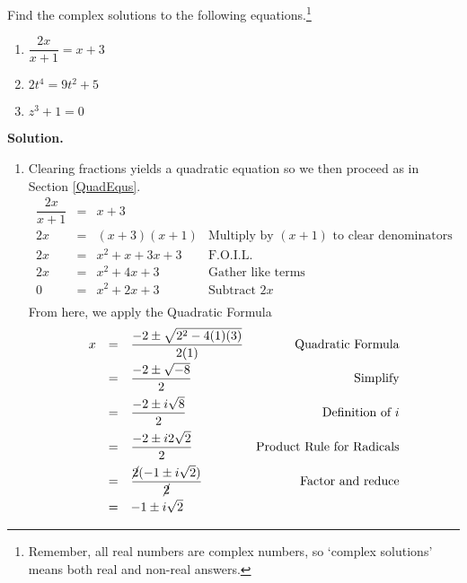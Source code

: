 \documentclass[10pt]{article}
\begin{document}
\begin{ex} \label{complexsolnsreviewex}  Find the complex solutions to the following equations.\footnote{Remember, all real numbers are complex numbers, so `complex solutions' means both real and non-real answers.} 

\begin{multicols}{3}
\begin{enumerate}


\item  $\dfrac{2x}{x+1} = x+3$

\item $2t^4 = 9t^2 + 5$

\item  $z^3 + 1 = 0$

\end{enumerate}
\end{multicols}

{\bf Solution.}

\begin{enumerate}

\enlargethispage{20pt}

\item  Clearing fractions yields a quadratic equation so we then proceed as in Section \ref{QuadEqus}.\[ \begin{array}{rclr}


\dfrac{2x}{x+1} & = &  x+3 & \\[5pt]
2x & = & (x+3)(x+1) & \text{Multiply by $(x+1)$ to clear denominators} \\

2x & = & x^2 + x + 3x + 3 & \text{F.O.I.L.} \\

2x & = & x^2 + 4x + 3 & \text{Gather like terms} \\

0 & = & x^2 + 2x + 3 & \text{Subtract $2x$} \\

\end{array}\] From here, we apply the Quadratic Formula \[ \begin{array}{rclr}

x  & =  & \dfrac{-2 \pm \sqrt{2^2 - 4(1)(3)}}{2(1)}  & \text{Quadratic Formula}\\[8pt]
    & = &  \dfrac{-2 \pm \sqrt{-8}}{2} & \text{Simplify}\\[8pt]
		& =  & \dfrac{-2 \pm i \sqrt{8}}{2} & \text{Definition of $i$}\\[8pt]
		& =  & \dfrac{-2 \pm i 2\sqrt{2}}{2} & \text{Product Rule for Radicals}\\[8pt]
		& = & \dfrac{\cancel{2}(-1 \pm i\sqrt{2})}{\cancel{2}} & \text{Factor and reduce}\\[8pt]
		& = & -1 \pm i \sqrt{2} & \\
		\end{array} \]
		

\end{enumerate}
\end{ex}
\end{document}
